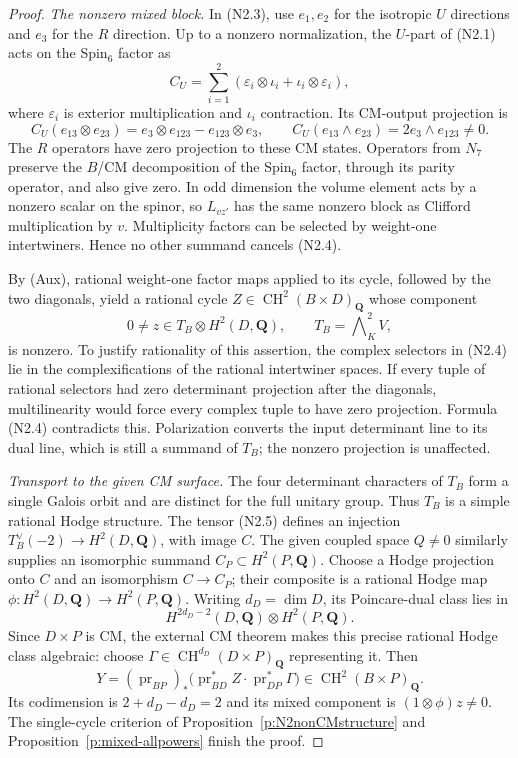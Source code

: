 \documentclass[11pt,reqno]{article}
\theoremstyle{emphasizedplain}
\theoremstyle{emphasizeddefinition}
\theoremstyle{emphasizeddefinition}
\DeclareMathOperator{\CH}{CH}
\newcommand{\Q}{\mathbf Q}
\begin{document}
\begin{proof}
\emph{The nonzero mixed block.}
In (N2.3), use $e_1,e_2$ for the isotropic $U$ directions and
$e_3$ for the $R$ direction. Up to a nonzero normalization, the
$U$-part of (N2.1) acts on the Spin$_6$ factor as
\[
 C_U=\sum_{i=1}^2(\varepsilon_i\otimes\iota_i+
                         \iota_i\otimes\varepsilon_i),
\]
where $\varepsilon_i$ is exterior multiplication and $\iota_i$
contraction. Its CM-output projection is
\[
 C_U(e_{13}\otimes e_{23})
       =e_3\otimes e_{123}-e_{123}\otimes e_3,
 \qquad
 C_U(e_{13}\wedge e_{23})=2e_3\wedge e_{123}\ne0.
                                                        \tag{N2.4}
\]
The $R$ operators have zero projection to these CM states.
Operators from $N_7$ preserve the $B$/CM decomposition of the
Spin$_6$ factor, through its parity operator, and also give zero.
In odd dimension the volume element acts by a nonzero scalar on
the spinor, so $L_{vz'}$ has the same nonzero block as Clifford
multiplication by $v$. Multiplicity factors can be selected by
weight-one intertwiners. Hence no other summand cancels (N2.4).

By (Aux), rational weight-one factor maps applied to its cycle,
followed by the two diagonals, yield a rational cycle
$Z\in\CH^2(B\times D)_\Q$ whose component
\[
       0\ne z\in T_B\otimes H^2(D,\Q),\qquad
       T_B=\bigwedge\nolimits_K^2V,                     \tag{N2.5}
\]
is nonzero. To justify rationality of this assertion, the complex
selectors in (N2.4) lie in the complexifications of the rational
intertwiner spaces. If every tuple of rational selectors had
zero determinant projection after the diagonals, multilinearity
would force every complex tuple to have zero projection.
Formula (N2.4) contradicts this. Polarization converts the input
determinant line to its dual line, which is still a summand of
$T_B$; the nonzero projection is unaffected.

\emph{Transport to the given CM surface.}
The four determinant characters of $T_B$ form a single Galois
orbit and are distinct for the full unitary group. Thus $T_B$
is a simple rational Hodge structure. The tensor (N2.5) defines
an injection $T_B^\vee(-2)\to H^2(D,\Q)$, with image $C$.
The given coupled space $Q\ne0$ similarly supplies an isomorphic
summand $C_P\subset H^2(P,\Q)$.
Choose a Hodge projection onto $C$ and an isomorphism $C\to C_P$;
their composite is a rational Hodge map
$\phi:H^2(D,\Q)\to H^2(P,\Q)$.
Writing $d_D=\dim D$, its Poincare-dual class lies in
\[
 H^{2d_D-2}(D,\Q)\otimes H^2(P,\Q).
 \tag{N2.6}
\]
Since $D\times P$ is CM, the external CM theorem makes this
precise rational Hodge class algebraic:
choose $\Gamma\in\CH^{d_D}(D\times P)_\Q$ representing it.
Then
\[
 Y=(\operatorname{pr}_{BP})_*
   \bigl(\operatorname{pr}_{BD}^*Z\cdot
         \operatorname{pr}_{DP}^*\Gamma\bigr)
       \in\CH^2(B\times P)_\Q.
\]
Its codimension is $2+d_D-d_D=2$ and its mixed component is
$(1\otimes\phi)z\ne0$. The single-cycle criterion of
Proposition~\ref{p:N2nonCMstructure} and
Proposition~\ref{p:mixed-allpowers} finish the proof.
\end{proof}
\end{document}
